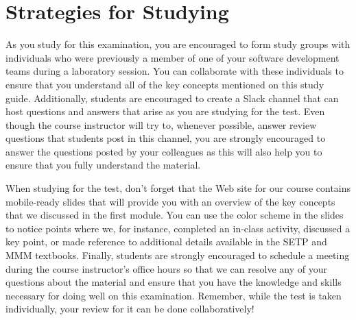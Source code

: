 \vspace*{-.15in}
\section*{Strategies for Studying}
\vspace*{-.05in}

As you study for this examination, you are encouraged to form study groups with individuals who were previously a
member of one of your software development teams during a laboratory session. You can collaborate with these individuals
to ensure that you understand all of the key concepts mentioned on this study guide. Additionally, students are
encouraged to create a Slack channel that can host questions and answers that arise as you are studying for the test.
Even though the course instructor will try to, whenever possible, answer review questions that students post in this
channel, you are strongly encouraged to answer the questions posted by your colleagues as this will also help you to
ensure that you fully understand the material.

When studying for the test, don't forget that the Web site for our course contains mobile-ready slides that will provide
you with an overview of the key concepts that we discussed in the first module. You can use the color scheme in the
slides to notice points where we, for instance, completed an in-class activity, discussed a key point, or made reference
to additional details available in the SETP and MMM textbooks. Finally, students are strongly encouraged to schedule a
meeting during the course instructor's office hours so that we can resolve any of your questions about the material and
ensure that you have the knowledge and skills necessary for doing well on this examination. Remember, while the test is
taken individually, your review for it can be done collaboratively!


